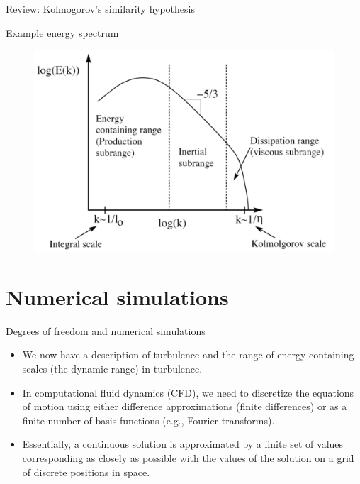 \begin{frame}{Review: Kolmogorov's similarity hypothesis}

Example energy spectrum
\begin{figure}
	\includegraphics[width=\textwidth]{spectrum2.png}
\end{figure}
\end{frame}

\section{Numerical simulations} %
\begin{frame}{Degrees of freedom and numerical simulations}

\begin{itemize}
	\item We now have a description of turbulence and the range of energy containing scales (the dynamic range) in turbulence.
	\item In computational fluid dynamics (CFD), we need to discretize the equations of motion using either difference approximations (finite differences) or as a finite number of basis functions (e.g., Fourier transforms).
	\item Essentially, a continuous solution is approximated by a finite set of values corresponding as closely as possible with the values of the solution on a grid of discrete positions in space.
\end{itemize}
\end{frame}

